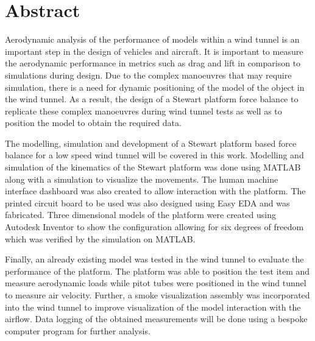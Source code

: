 
\section*{Abstract}
\label{sec:Abstract}
Aerodynamic analysis of the performance of models within a wind tunnel is an important step in the design of vehicles and aircraft. It is important to measure the aerodynamic performance in metrics such as drag and lift in comparison to simulations during design.
Due to the complex manoeuvres that may require simulation, there is a need for dynamic positioning of the model of the object in the wind tunnel. As a result, the design of a Stewart platform force balance to replicate these complex manoeuvres during wind tunnel tests as well as to position the model to obtain the required data.

The modelling, simulation and development of a Stewart platform
based force balance for a low speed wind tunnel will be covered in this work.
Modelling and simulation of the kinematics of the Stewart platform was done using MATLAB along with a simulation to visualize the movements. 
The human machine interface dashboard was also created to allow interaction with the platform. The printed circuit board to be used was also designed using Easy EDA and was fabricated. Three dimensional models of the platform were created using Autodesk Inventor to show the configuration allowing for six degrees of freedom which was verified by the simulation on MATLAB.

Finally, an already existing model was tested in the wind tunnel to evaluate the performance
of the platform. The platform was able to position the test
item and measure aerodynamic loads while pitot tubes were positioned in the wind tunnel to measure air velocity.
Further, a smoke visualization assembly was incorporated into the wind tunnel to improve visualization of the model 
interaction with the airflow.
 Data logging of the obtained measurements will be done using a bespoke computer program for further analysis.


